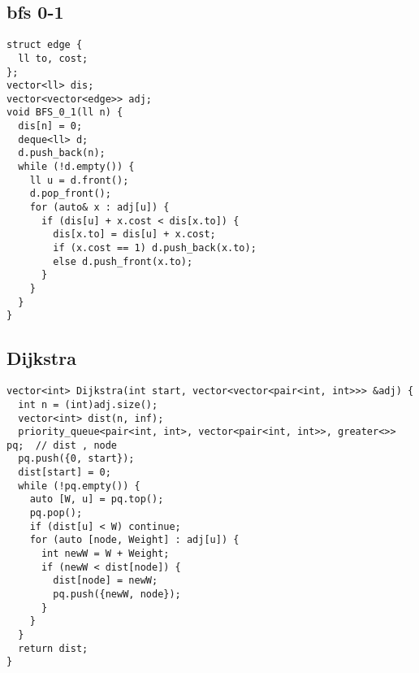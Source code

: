 \documentclass[twoside]{article}
\begin{document}
\begin{multicols*}{2}
{
\subsection*{bfs 0-1}
}
\begin{verbatim}
struct edge {
  ll to, cost;
};
vector<ll> dis;
vector<vector<edge>> adj;
void BFS_0_1(ll n) {
  dis[n] = 0;
  deque<ll> d;
  d.push_back(n);
  while (!d.empty()) {
    ll u = d.front();
    d.pop_front();
    for (auto& x : adj[u]) {
      if (dis[u] + x.cost < dis[x.to]) {
        dis[x.to] = dis[u] + x.cost;
        if (x.cost == 1) d.push_back(x.to);
        else d.push_front(x.to);
      }
    }
  }
}
\end{verbatim}

{
\subsection*{Dijkstra}
}
\begin{verbatim}
vector<int> Dijkstra(int start, vector<vector<pair<int, int>>> &adj) {
  int n = (int)adj.size();
  vector<int> dist(n, inf);
  priority_queue<pair<int, int>, vector<pair<int, int>>, greater<>> pq;  // dist , node
  pq.push({0, start});
  dist[start] = 0;
  while (!pq.empty()) {
    auto [W, u] = pq.top();
    pq.pop();
    if (dist[u] < W) continue;
    for (auto [node, Weight] : adj[u]) {
      int newW = W + Weight;
      if (newW < dist[node]) {
        dist[node] = newW;
        pq.push({newW, node});
      }
    }
  }
  return dist;
}

\end{verbatim}

{
}
\end{multicols*}
\end{document}
